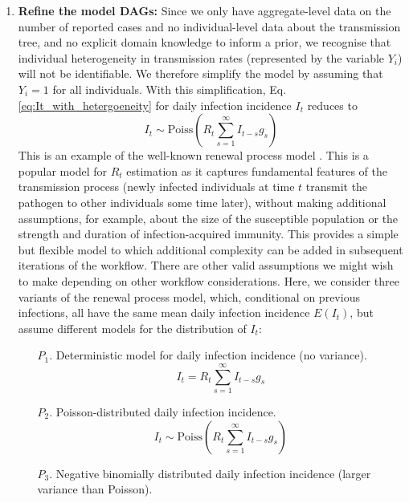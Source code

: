 \documentclass{article}
\begin{document}
\begin{enumerate}
\item \textbf{Refine the model DAGs:} Since we only have aggregate-level data on the number of reported cases and no individual-level data about the transmission tree, and no explicit domain knowledge to inform a prior, we recognise that individual heterogeneity in transmission rates (represented by the variable $Y_i$) will not be identifiable. We therefore simplify the model by assuming that $Y_i=1$ for all individuals. With this simplification, Eq. \eqref{eq:It_with_hetergoeneity} for daily infection incidence $I_t$ reduces to
    \begin{equation} 
        I_t \sim \mathrm{Poiss}\left( R_t \sum_{s=1}^\infty I_{t-s}g_s  \right)
    \end{equation}
    This is an example of the well-known renewal process model \cite{fraser2007estimating}. This is a popular model for $R_t$ estimation as it captures fundamental features of the transmission process (newly infected individuals at time $t$ transmit the pathogen to other individuals some time later), without making additional assumptions, for example, about the size of the susceptible population or the strength and duration of infection-acquired immunity. This provides a simple but flexible model to which additional complexity can be added in subsequent iterations of the workflow.
    There are other valid assumptions we might wish to make depending on other workflow considerations. Here, we consider three variants of the renewal process model, which, conditional on previous infections, all have the same mean daily infection incidence $E(I_t)$, but assume different models for the distribution of $I_t$:
    \begin{itemize}
    \item[$P_1$.] Deterministic model for daily infection incidence (no variance).
    \begin{equation} \label{eq:infections_P1}
        I_t = R_t \sum_{s=1}^\infty I_{t-s}g_s 
    \end{equation}
    \item[$P_2$.] Poisson-distributed daily infection incidence.
        \begin{equation} \label{eq:infections_P2}
        I_t \sim \mathrm{Poiss}\left( R_t \sum_{s=1}^\infty I_{t-s}g_s  \right)
    \end{equation}
    \item[$P_3$.] Negative binomially distributed daily infection incidence (larger variance than Poisson). 
            \begin{equation} \label{eq:infections_P3}

\end{equation}
\end{itemize}
\end{enumerate}
\end{document}
